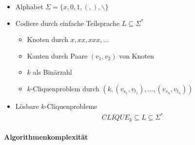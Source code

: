 \documentclass{scrartcl}
\begin{document}
\begin{itemize}
	\item Alphabet $\Sigma = \{ x,0,1,(,),\backslash \}$
	\item Codiere durch einfache Teilsprache $L \subseteq \Sigma^*$
	\begin{itemize}
		\item Knoten durch $x,xx,xxx,\ldots$
		\item Kanten durch Paare $(v_1,v_2)$ von Knoten
		\item $k$ als Binärzahl
		\item $k$-Cliquenproblem durch $(k,(v_{s_1},v_{t_1}),\ldots,(v_{s_n},v_{t_n}))$
	\end{itemize}
	\item Lösbare $k$-Cliquenprobleme
	\begin{align*}
		CLIQUE_k \subseteq L \subseteq \Sigma^*
	\end{align*}
\end{itemize}

\paragraph{Algorithmenkomplexität}
\end{document}
